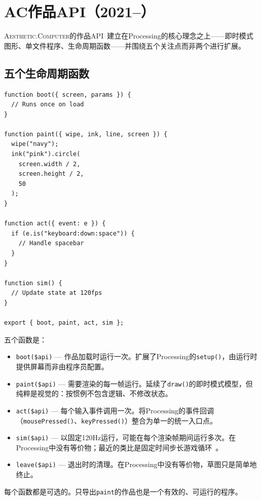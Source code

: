 \documentclass[10pt,letterpaper,twocolumn]{article}
\newcommand{\ac}{\textsc{Aesthetic.Computer}}
\begin{document}

\section{AC作品API（2021--）}
\label{sec:ac}

\ac{}的作品API~\citep{scudder2026ac}建立在Processing的核心理念之上——即时模式图形、单文件程序、生命周期函数——并围绕五个关注点而非两个进行扩展。

\subsection{五个生命周期函数}

\begin{lstlisting}[style=acjsstyle,caption={最小AC作品。}]
function boot({ screen, params }) {
  // Runs once on load
}

function paint({ wipe, ink, line, screen }) {
  wipe("navy");
  ink("pink").circle(
    screen.width / 2,
    screen.height / 2,
    50
  );
}

function act({ event: e }) {
  if (e.is("keyboard:down:space")) {
    // Handle spacebar
  }
}

function sim() {
  // Update state at 120fps
}

export { boot, paint, act, sim };
\end{lstlisting}

五个函数是：

\begin{itemize}
  \item \texttt{boot(\$api)} --- 作品加载时运行一次。扩展了Processing的\texttt{setup()}，由运行时提供屏幕而非由程序员配置。
  \item \texttt{paint(\$api)} --- 需要渲染的每一帧运行。延续了\texttt{draw()}的即时模式模型，但纯粹是视觉的：按惯例不包含逻辑、不修改状态。
  \item \texttt{act(\$api)} --- 每个输入事件调用一次。将Processing的事件回调（\texttt{mousePressed()}、\texttt{keyPressed()}）整合为单一的统一入口点。
  \item \texttt{sim(\$api)} --- 以固定120Hz运行，可能在每个渲染帧期间运行多次。在Processing中没有等价物；最近的类比是固定时间步长游戏循环~\citep{nystrom2014game}。
  \item \texttt{leave(\$api)} --- 退出时的清理。在Processing中没有等价物，草图只是简单地终止。
\end{itemize}

每个函数都是可选的。只导出\texttt{paint}的作品也是一个有效的、可运行的程序。
\end{document}
